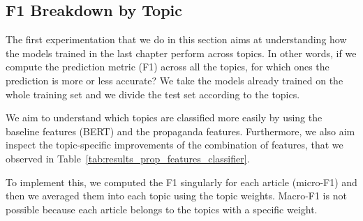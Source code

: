 \subsection{\statusgreen F1 Breakdown by Topic}
\label{sec:topic_classifier_propaganda_f1_across}

The first experimentation that we do in this section aims at understanding how the models trained in the last chapter perform across topics.
In other words, if we compute the prediction metric (F1) across all the topics, for which ones the prediction is more or less accurate?
We take the models already trained on the whole training set and we divide the test set according to the topics.

We aim to understand which topics are classified more easily by using the baseline features (BERT) and the propaganda features. Furthermore, we also aim inspect the topic-specific improvements of the combination of features, that we observed in Table~\ref{tab:results_prop_features_classifier}. 

To implement this, we computed the F1 singularly for each article (micro-F1) and then we averaged them into each topic using the topic weights. Macro-F1 is not possible because each article belongs to the topics with a specific weight.


